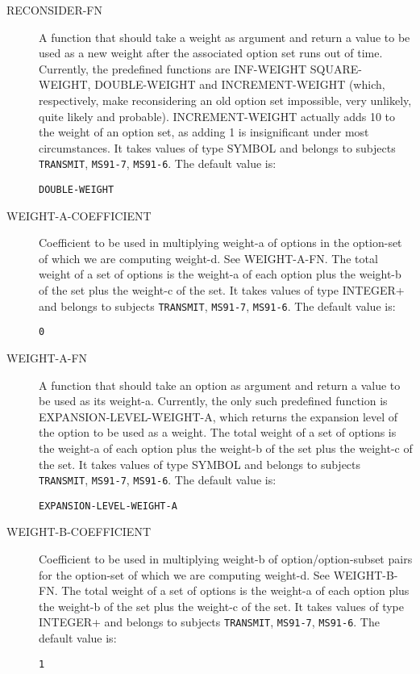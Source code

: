 \begin{description}
\item[RECONSIDER-FN]  
A function that should take a weight as argument and
return a value to be used as a new weight after the associated option set
runs out of time. Currently, the predefined functions are INF-WEIGHT 
SQUARE-WEIGHT, DOUBLE-WEIGHT and INCREMENT-WEIGHT (which, respectively,
make reconsidering an old option set impossible, very unlikely,
quite likely and probable). INCREMENT-WEIGHT actually adds 10 to the weight 
of an option set, as adding 1 is insignificant under most circumstances.
It takes values of type SYMBOL and belongs to subjects \texttt{TRANSMIT}, \texttt{MS91-7}, \texttt{MS91-6}.  The default value is: \begin{lstlisting}
DOUBLE-WEIGHT
\end{lstlisting}

\item[WEIGHT-A-COEFFICIENT]  
Coefficient to be used in multiplying weight-a of options in
the option-set of which we are computing weight-d. See WEIGHT-A-FN.
The total weight of a set of options is the weight-a of each option
plus the weight-b of the set plus the weight-c of the set.
It takes values of type INTEGER+ and belongs to subjects \texttt{TRANSMIT}, \texttt{MS91-7}, \texttt{MS91-6}.  The default value is: \begin{lstlisting}
0
\end{lstlisting}

\item[WEIGHT-A-FN]  
A function that should take an option as argument and
return a value to be used as its weight-a. Currently, the only 
such predefined function is EXPANSION-LEVEL-WEIGHT-A, which returns
the expansion level of the option to be used as a weight.
The total weight of a set of options is the weight-a of each option
plus the weight-b of the set plus the weight-c of the set.
It takes values of type SYMBOL and belongs to subjects \texttt{TRANSMIT}, \texttt{MS91-7}, \texttt{MS91-6}.  The default value is: \begin{lstlisting}
EXPANSION-LEVEL-WEIGHT-A
\end{lstlisting}

\item[WEIGHT-B-COEFFICIENT]  
Coefficient to be used in multiplying weight-b of option/option-subset
pairs for the option-set of which we are computing weight-d. See
WEIGHT-B-FN. The total weight of a set of options is the weight-a of 
each option plus the weight-b of the set plus the weight-c of the set.
It takes values of type INTEGER+ and belongs to subjects \texttt{TRANSMIT}, \texttt{MS91-7}, \texttt{MS91-6}.  The default value is: \begin{lstlisting}
1
\end{lstlisting}


\end{description}
